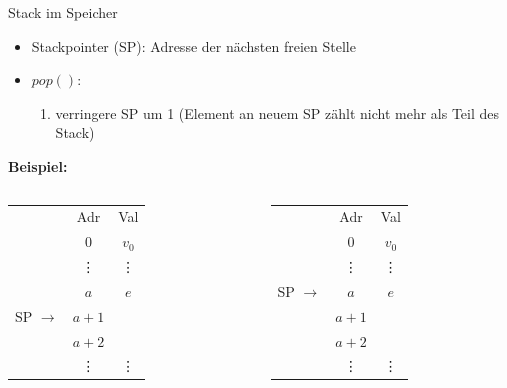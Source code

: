 \begin{frame}{Stack im Speicher}
	\begin{itemize}
		\item Stackpointer (SP): Adresse der nächsten freien Stelle
		\item $pop()$: \begin{enumerate}
			\item verringere SP um 1 (Element an neuem SP zählt nicht mehr als Teil des Stack)
		\end{enumerate}
	\end{itemize}

	\bigskip
	\textbf{Beispiel:}
	\begin{columns}	
		\begin{column}{.3\textwidth}
			\centering \begin{tabular}{cc|c}
				& Adr & Val \\
				\cline{2-3}
				& $0$ & $v_0$ \\
				& \vdots & \vdots \\
				& $a$ & $e$\\
				SP $\rightarrow$ & $a + 1$ &  \\
				& $a + 2$ &  \\
				& \vdots & \vdots 
			\end{tabular}
		\end{column}
		\begin{column}{.3\textwidth}
			\centering \begin{tabular}{cc|c}
				& Adr & Val \\
				\cline{2-3}
				& $0$ & $v_0$ \\
				& \vdots & \vdots \\
				SP $\rightarrow$ & $a$ & $e$\\
				& $a + 1$ &  \\
				& $a + 2$ &  \\
				& \vdots & \vdots 
			\end{tabular}
		\end{column}
	\end{columns}
\end{frame}

